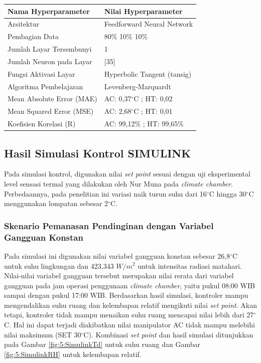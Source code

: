 \documentclass[a4paper,10pt]{article}
\makeatletter
\newenvironment{body}{\begin{multicols}{2}}{\end{multicols}}
\renewenvironment{table}
{\def\@captype{table}%
	\captionsetup{format=plain,labelsep=newline,font=footnotesize,textfont=sc,justification=centering}%
	\fontsize{8}{8}\selectfont
}
{}
\makeatother
\begin{document}
\begin{body}
		\begin{table}
			\centering
			\caption{Tabel Rancangan Kontroler JST (\textit{NN Inverse Model})}
			\label{tbl:5:NNControl}
			\begin{tabularx}{\linewidth}{XX}\toprule
				\textbf{Nama Hyperparameter} & \textbf{Nilai Hyperparameter} \\ \toprule
				Arsitektur & Feedforward Neural Network \\ \midrule
				Pembagian Data & 80\% 10\% 10\% \\ \midrule 
				Jumlah Layar Tersembunyi & 1 \\ \midrule
				Jumlah Neuron pada Layar & [35] \\ \midrule
				Fungsi Aktivasi Layar & Hyperbolic Tangent (tansig) \\ \midrule
				Algoritma Pembelajaran & Levenberg-Marquardt \\ \midrule
				Mean Absolute Error (MAE) & AC: 0,37$^\circ$C ; HT: 0,02\\ \midrule
				Mean Squared Error (MSE) & AC: 2,68$^\circ$C ; HT: 0,01\\ \midrule
				Koefisien Korelasi (R) & AC: 99,12\% ; HT: 99,65\% \\ \bottomrule
			\end{tabularx}
		\end{table}
				
		\subsection{Hasil Simulasi Kontrol SIMULINK}
		
		Pada simulasi kontrol, digunakan nilai \textit{set point} sesuai dengan uji eksperimental level sensasi termal yang dilakukan oleh Nur Muna pada \textit{climate chamber}\cite{skripsiMuna}. Perbedaannya, pada penelitian ini variasi naik turun suhu dari 16$^\circ$C hingga 30$^\circ$C menggunakan lompatan sebesar 2$^\circ$C.
		
		\subsubsection{Skenario Pemanasan Pendinginan dengan Variabel Gangguan Konstan}
		
		Pada simulasi ini digunakan nilai variabel gangguan konstan sebesar 26,8$^\circ$C untuk suhu lingkungan dan 423,343 $W/m^2$ untuk intensitas radiasi matahari. Nilai-nilai variabel gangguan tersebut merupakan nilai rerata dari variabel gangguan pada jam operasi penggunaan \textit{climate chamber}, yaitu pukul 08:00 WIB sampai dengan pukul 17:00 WIB. Berdasarkan hasil simulasi, kontroler mampu mengendalikan suhu ruang dan kelembapan relatif mengikuti nilai \textit{set point}. Akan tetapi, kontroler tidak mampu menaikan suhu ruang mencapai nilai lebih dari 27$^\circ$C. Hal ini dapat terjadi diakibatkan nilai manipulator AC tidak mampu melebihi nilai maksimum (SET 30$^\circ$C). Kombinasi \textit{set point} dan hasil simulasi ditunjukkan pada Gambar \ref{fig:5:SimulinkTd} untuk suhu ruang dan Gambar \ref{fig:5:SimulinkRH} untuk kelembapan relatif.
		

\end{body}
\end{document}
